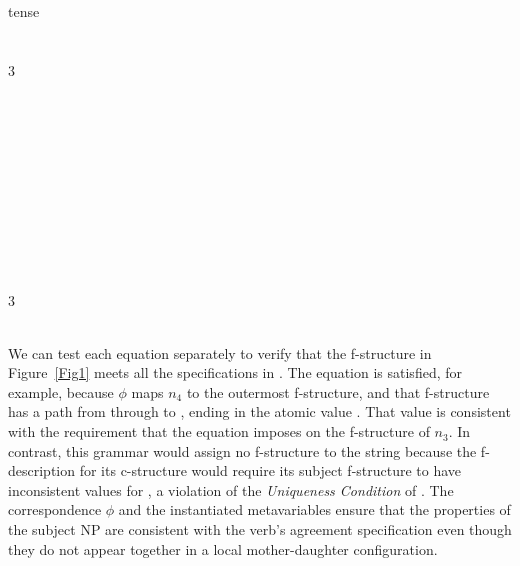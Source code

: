 \documentclass[output=paper,hidelinks]{langscibook}
\begin{document}
\ea\label{instfd}
 \parbox[t]{15em}{ %
 \\
  {}\\
  {tense}\\
  {}\\
 \\
3\\
\\
  {}\\
  \\
}
\parbox[t]{0em}{
\\
\\
 \\
  {}\\
  {}\\
 \\
 \\
 3\\
 \\
 }
\z

\sloppy\noindent We can test each equation separately to verify that the f-structure in Figure~\ref{Fig1} meets all the specifications in .  The equation  is satisfied, for example, because $\phi$ maps $n_4$ to the outermost f-structure, and that f-structure has a path from  through  to , ending in the atomic value .  That value is consistent with the requirement that the equation  imposes on the f-structure of $n_3$. In contrast, this grammar would assign no f-structure to the string
\/ because the f-description for its c-structure would require its subject f-structure to have inconsistent values for , a violation of the \emph{Uniqueness Condition} of \citet{kaplanbresnan82}.  The correspondence $\phi$ and the instantiated metavariables ensure that the properties of the subject NP are consistent with the verb's agreement specification even though they do not appear together in a local mother-daughter configuration.
\end{document}
